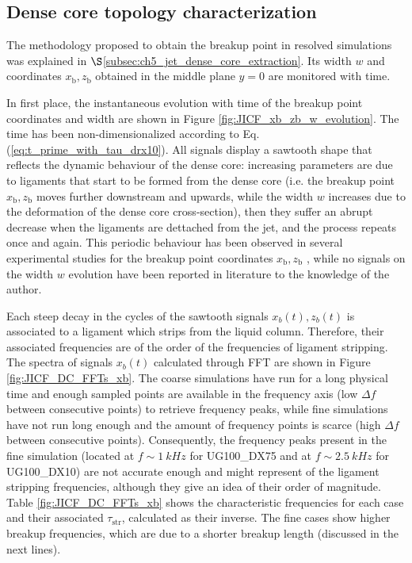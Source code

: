 \subsection{Dense core topology characterization}
\label{subsec:ch5_DC_topology_characterization}

The methodology proposed to obtain the breakup point in resolved simulations was explained in $\S$\ref{subsec:ch5_jet_dense_core_extraction}. Its width $w$ and coordinates $x_\mathrm{b}, z_\mathrm{b}$ obtained in the middle plane $y = 0$ are monitored with time. 

In first place, the instantaneous evolution with time of the breakup point coordinates and width are shown in Figure \ref{fig:JICF_xb_zb_w_evolution}. The time has been non-dimensionalized according to Eq. (\ref{eq:t_prime_with_tau_drx10}). All signals display a sawtooth shape that reflects the dynamic behaviour of the dense core: increasing parameters are due to ligaments that start to be formed from the dense core (i.e. the breakup point $x_\mathrm{b}, z_\mathrm{b}$ moves further downstream and upwards, while the width $w$ increases due to the deformation of the dense core cross-section), then they suffer an abrupt decrease when the ligaments are dettached from the jet, and the process repeats once and again.  This periodic behaviour has been observed in several experimental studies for the breakup point coordinates $x_\mathrm{b}, z_\mathrm{b}$ , while no signals on the width $w$ evolution have been reported in literature to the knowledge of the author.

Each steep decay in the cycles of the sawtooth signals $x_b (t), z_b (t)$ is associated to a ligament which strips from the liquid column. Therefore, their associated frequencies are of the order of the frequencies of ligament stripping. The spectra of signals $x_b (t)$ calculated through FFT are shown in Figure \ref{fig:JICF_DC_FFTs_xb}. The coarse simulations have run for a long physical time and enough sampled points are available in the frequency axis (low $\Delta f$ between consecutive points) to retrieve frequency peaks, while fine simulations have not run long enough and the amount of frequency points is scarce (high $\Delta f$ between consecutive points). Consequently, the frequency peaks present in the fine simulation (located at $f \sim 1~kHz$ for UG100\_DX75 and at $f \sim 2.5~kHz$ for UG100\_DX10) are not accurate enough and might represent of the ligament stripping frequencies, although they give an idea of their order of magnitude. Table \ref{fig:JICF_DC_FFTs_xb} shows the characteristic frequencies for each case and their associated $\tau_\mathrm{str}$, calculated as their inverse. The fine cases show higher breakup frequencies, which are due to a shorter breakup length (discussed in the next lines). 

